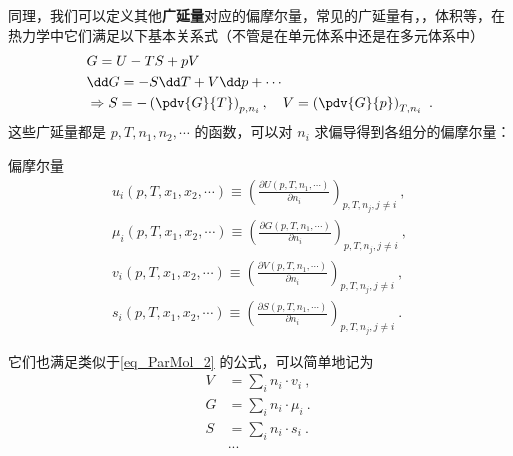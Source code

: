 同理，我们可以定义其他\textbf{广延量}对应的偏摩尔量，常见的广延量有，，体积等，在热力学中它们满足以下基本关系式（不管是在单元体系中还是在多元体系中）
\begin{equation}\label{eq_ParMol_3}
\begin{aligned}
&G=U-TS+pV\\
&\dd G=-S\dd T+V\dd p+\cdots\\
&\Rightarrow S=-\left(\pdv{G}{T}\right)_{p,n_i},\quad V=\left(\pdv{G}{p}\right)_{T,n_i}~.
\end{aligned}
\end{equation}
这些广延量都是 $p,T,n_1,n_2,\cdots$ 的函数，可以对 $n_i$ 求偏导得到各组分的偏摩尔量：
\begin{definition}{偏摩尔量}
\begin{equation}\label{eq_ParMol_4}
\begin{aligned}
u_i(p,T,x_1,x_2,\cdots )\equiv \left(\frac{\partial U(p,T,n_1,\cdots)}{\partial n_i}\right)_{p,T,n_j,j\neq i}~,\\
\mu_i(p,T,x_1,x_2,\cdots )\equiv \left(\frac{\partial G(p,T,n_1,\cdots)}{\partial n_i}\right)_{p,T,n_j,j\neq i}~,\\
v_i(p,T,x_1,x_2,\cdots )\equiv \left(\frac{\partial V(p,T,n_1,\cdots)}{\partial n_i}\right)_{p,T,n_j,j\neq i}~,\\
s_i(p,T,x_1,x_2,\cdots )\equiv \left(\frac{\partial S(p,T,n_1,\cdots)}{\partial n_i}\right)_{p,T,n_j,j\neq i}~.
\end{aligned}
\end{equation}
\end{definition}
它们也满足类似于\autoref{eq_ParMol_2} 的公式，可以简单地记为
\begin{equation}
\begin{aligned}
V &= \sum_i  n_i \cdot v_i ~,\\
G &= \sum_i  n_i \cdot \mu_i~.\\
S &= \sum_i  n_i \cdot s_i~.\\
&...\\
\end{aligned}~
\end{equation}
